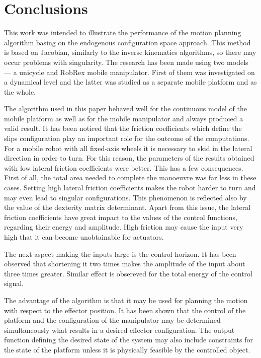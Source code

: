 \chapter{Conclusions}
\label{ch:concl}
This work was intended to illustrate the performance of the motion planning algorithm
basing on the endogenous configuration space approach. This method is based on Jacobian,
similarly to the inverse kinematics algorithms, so there may occur problems with
singularity.
The research has been made 
using two models --- a unicycle and RobRex mobile manipulator. First of them was investigated
on a dynamical level and the latter was studied as a separate mobile platform and as the whole.

The algorithm used in this paper behaved well for the continuous model of the mobile platform
as well as for the mobile manipulator and always produced a valid result.
It has been noticed that the friction coefficients which
define the slips configuration play an important role for the outcome of the computations.
For a mobile robot with all fixed-axis wheels it is necessary to skid in the lateral direction
in order to turn. For this reason, the parameters of the results obtained with low lateral friction
coefficients were better. This has a few consequences. First of all, the total area needed to
complete the manoeuvre was far less in these cases. Setting high lateral friction
coefficients makes the robot harder to turn and may even lead to singular configurations.
This phenomenon is reflected also by the value of the dexterity matrix determinant.
Apart from this issue, the lateral friction coefficients have great impact to the values
of the control functions, regarding their energy and amplitude. High friction may cause
the input very high that it can become unobtainable for actuators.

The next aspect making the inputs large is the control horizon. It has been observed that shortening
it two times makes the amplitude of the input about three times greater. Similar effect is obsereved
for the total energy of the control signal.

The advantage of the algorithm is that it may be used for planning the motion with respect
to the effector position. It has been shown that the control of the platform and the configuration
of the manipulator may be determined simultaneously what results in a desired effector configuration.
The output function defining the desired state of the system may also include constraints
for the state of the platform unless it is physically feasible by the controlled object.

